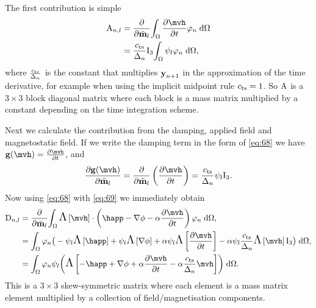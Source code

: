 {The first contribution is simple
\begin{equation}
  \begin{aligned}
    \Am_{n,l} &= \pd{}{\mvdis_l} \intd{ \dmdth \tbf_n } \\
           &= \jts \Idm_3 \intd{ \sbf_l \tbf_n},
  \end{aligned}
\end{equation}
where $\frac{c_\mathrm{ts}}{\Delta_{n}}$ is the constant that multiplies $\boldsymbol{\mathrm{y}}_{n+1}$ in the approximation of the time derivative, for example when using the implicit midpoint rule $c_\mathrm{ts} = 1$.
So $\mathrm{A}$ is a $3\times3$ block diagonal matrix where each block is a mass matrix multiplied by a constant depending on the time integration scheme.

Next we calculate the contribution from the damping, applied field and magnetostatic field.
If we write the damping term in the form of \cref{eq:68} we have $\gv(\mvh) = \dmdth$, and
\begin{equation}
  \label{eq:69}
  \pd{\gv(\mvh)}{\mvdis_l} = \pd{}{\mvdis_l} \left(\pd{\mvh}{t} \right) = \jts \sbf_l \Idm_3.
\end{equation}
Now using \cref{eq:68} with \cref{eq:69} we immediately obtain
\begin{equation}
  \begin{aligned}
    \Dm_{n,l} &= \pd{}{\mvdis_l} \intd{  \skewm{\mvh} \cdot
      \left( \happ - \grad \phim - \dampc \dmdth
      \right) \tbf_n}, \\
    &= \int_\magd \tbf_n \big( -\sbf_l\skewm{\happ} + \sbf_l\skewm{\grad \phi} + \dampc\sbf_l \skewm{\dmdth} - \dampc\sbf_l \jts \skewm{\mvh} \Idm_3
    \big) \d\magd, \\
    &= \intd{ \tbf_n \sbf_l \bigb{ \skewm{-\happ + \grad \phi
          + \dampc \dmdth - \dampc \jts \mvh}}}.
    \label{eq:field-damping-jacobian}
  \end{aligned}
\end{equation}
This is a $3\times3$ skew-symmetric matrix where each element is a mass matrix element multiplied by a collection of field/magnetisation components.

}
